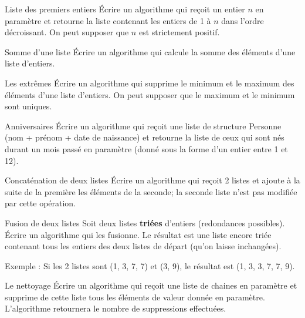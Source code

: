 		\begin{Exercice}{Liste des premiers entiers}
			Écrire un algorithme qui reçoit un entier $n$ en paramètre et retourne la
			liste contenant les entiers de 1 à $n$ dans l'ordre
			décroissant. On peut supposer que $n$ est strictement positif.
		\end{Exercice}
			
		\begin{Exercice}{Somme d'une liste}
			Écrire un algorithme qui calcule la somme des éléments d’une liste
			d’entiers.
		\end{Exercice}
		
		\begin{Exercice}{Les extrêmes}
				Écrire un algorithme qui supprime le minimum et le maximum des éléments
				d’une liste d’entiers. On peut supposer que le maximum et le minimum
				sont uniques.
		\end{Exercice}
		
		\begin{Exercice}{Anniversaires}
				Écrire un algorithme qui reçoit une liste de structure Personne 
				(nom + prénom + date de naissance) et retourne la liste
				de ceux qui sont nés durant un mois passé en paramètre 
				(donné sous la forme d'un entier entre 1 et 12).
		\end{Exercice}
			
		\begin{Exercice}{Concaténation de deux listes}
				Écrire un algorithme qui reçoit 2 listes et ajoute
				à la suite de la première les éléments de la seconde; la seconde liste
				n'est pas modifiée par cette opération.
		\end{Exercice}
		
		\begin{Exercice}{Fusion de deux listes}
				Soit deux listes \textbf{triées}
				d'entiers (redondances possibles). Écrire un algorithme
				qui les fusionne. Le résultat est une liste encore triée contenant
				tous les entiers des deux listes de départ (qu'on
				laisse inchangées).
		
				Exemple : Si les 2 listes sont (1, 3, 7, 7) et (3, 9), 
				le résultat est (1, 3, 3, 7, 7, 9).
		\end{Exercice}
		
		\begin{Exercice}{Le nettoyage}
			Écrire un algorithme qui reçoit une liste de chaines en paramètre et
			supprime de cette liste tous les éléments de valeur donnée en
			paramètre. L'algorithme retournera le nombre de
			suppressions effectuées.
		\end{Exercice}
		

